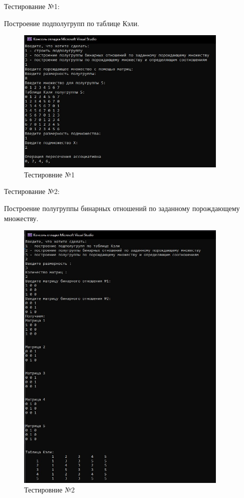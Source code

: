 \documentclass[bachelor, och, labwork]{shiza}
\begin{document}
	Тестирование №1:
	
Построение подполугрупп по таблице Кэли.

	\begin{figure}[H]
		\centering
		\includegraphics[width=0.9\textwidth]{test_1}
		\caption{Тестировние №1}
		\label{fig:test_1}
	\end{figure}
	
	Тестирование №2:
	
Построение полугруппы бинарных отношений по заданному порождающему множеству.
	
	\begin{figure}[H]
		\centering
		\includegraphics[width=0.9\textwidth]{test_2}
		\caption{Тестировние №2}
		\label{fig:test_2}
	\end{figure}
	
\end{document}
